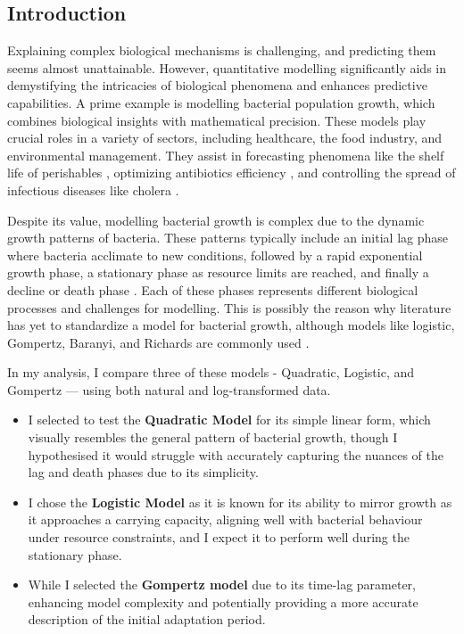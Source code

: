 \documentclass[11pt]{article}
\begin{document}
\begin{sloppy}

\section*{Introduction}
Explaining complex biological mechanisms is challenging, and predicting them seems almost unattainable. 
However, quantitative modelling significantly aids in demystifying the intricacies of biological phenomena and enhances predictive capabilities. 
A prime example is modelling bacterial population growth, which combines biological insights with mathematical precision. 
These models play crucial roles in a variety of sectors, including healthcare, the food industry, and environmental management. They assist in forecasting phenomena like the shelf life of perishables \parencite[]{Koseki2016}, optimizing antibiotics efficiency \parencite{Coates2018}, and controlling the spread of infectious diseases like cholera \parencite[]{Singh2024, Brhane2024}.

Despite its value, modelling bacterial growth is complex due to the dynamic growth patterns of bacteria. These patterns typically include an initial lag phase where bacteria acclimate to new conditions, followed by a rapid exponential growth phase, a stationary phase as resource limits are reached, and finally a decline or death phase \parencite[]{Kumakura2023, Bate2023, Monod1949, Rolfe2012}. Each of these phases represents different biological processes and challenges for modelling. This is possibly the reason why literature has yet to standardize a model for bacterial growth, although models like logistic, Gompertz, Baranyi, and Richards are commonly used \parencite[]{Jewell2012, Huang2013, Lopez2004, Buchanan1997, Pla2015}. 
\end{sloppy}

In my analysis, I compare three of these models - Quadratic, Logistic, and Gompertz — using both natural and log-transformed data. 
\begin{itemize}
    \item I selected to test the \textbf{Quadratic Model} for its simple linear form, which visually resembles the general pattern of bacterial growth, though I hypothesised it would struggle with accurately capturing the nuances of the lag and death phases due to its simplicity. 
    \item I chose the \textbf{Logistic Model} as it is known for its ability to mirror growth as it approaches a carrying capacity, aligning well with bacterial behaviour under resource constraints, and I expect it to perform well during the stationary phase. 
    \item While I selected the \textbf{Gompertz model} due to its time-lag parameter, enhancing model complexity and potentially providing a more accurate description of the initial adaptation period.
\end{itemize}
\end{document}
